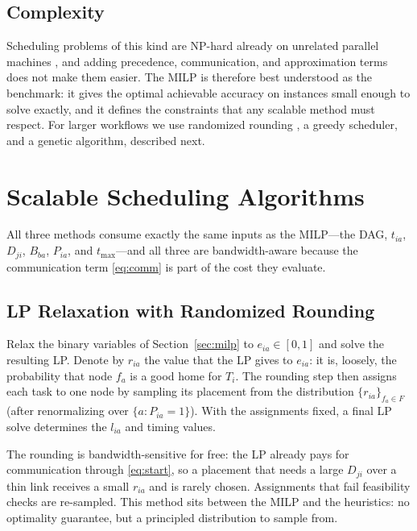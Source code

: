\documentclass[conference]{IEEEtran}
\begin{document}
\subsection{Complexity}

Scheduling problems of this kind are NP-hard already on unrelated parallel machines \cite{lenstra1990approximation}, and adding precedence, communication, and approximation terms does not make them easier. The MILP is therefore best understood as the benchmark: it gives the optimal achievable accuracy on instances small enough to solve exactly, and it defines the constraints that any scalable method must respect. For larger workflows we use randomized rounding \cite{raghavan1987randomized}, a greedy scheduler, and a genetic algorithm, described next.

\section{Scalable Scheduling Algorithms}
\label{sec:algorithms}

All three methods consume exactly the same inputs as the MILP---the DAG, $t_{ia}$, $D_{ji}$, $B_{ba}$, $P_{ia}$, and $t_{\max}$---and all three are bandwidth-aware because the communication term \eqref{eq:comm} is part of the cost they evaluate.

\subsection{LP Relaxation with Randomized Rounding}

Relax the binary variables of Section~\ref{sec:milp} to $e_{ia}\in[0,1]$ and solve the resulting LP. Denote by $r_{ia}$ the value that the LP gives to $e_{ia}$: it is, loosely, the probability that node $f_a$ is a good home for $T_i$. The rounding step then assigns each task to one node by sampling its placement from the distribution $\{r_{ia}\}_{f_a\in F}$ (after renormalizing over $\{a:P_{ia}=1\}$). With the assignments fixed, a final LP solve determines the $l_{ia}$ and timing values.

The rounding is bandwidth-sensitive for free: the LP already pays for communication through \eqref{eq:start}, so a placement that needs a large $D_{ji}$ over a thin link receives a small $r_{ia}$ and is rarely chosen. Assignments that fail feasibility checks are re-sampled. This method sits between the MILP and the heuristics: no optimality guarantee, but a principled distribution to sample from.
\end{document}
